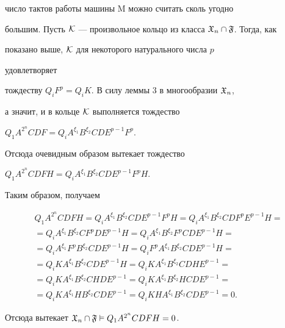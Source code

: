 число тактов работы машины M можно считать сколь угодно  


большим. Пусть $\cal K$ --- произвольное кольцо из класса $\frak 


X_n\cap\frak F$. Тогда, как  


показано выше, $\cal K$ для некоторого натурального числа $p$ 


удовлетворяет  


тождеству $Q_i F^p=Q_i K$. В силу леммы 3 в многообразии $\frak X_n$,  


а значит, и в кольце $\cal K$ выполняется тождество 


$Q_1A^{2^n}C D F=Q_i A^{\xi_1}B^{\xi_2}C D E^{p-1}F^p$. 


Отсюда очевидным образом вытекает тождество 


$Q_1A^{2^n}C D F H=Q_i A^{\xi_1}B^{\xi_2}C D E^{p-1}F^p H$. 


Таким образом, получаем 


\begin{multline*} 


Q_1A^{2^n}C D F H=Q_i A^{\xi_1}B^{\xi_2}C D E^{p-1}F^p H= 


Q_i A^{\xi_1}B^{\xi_2}C D F^p E^{p-1}H= \\ 


=Q_i A^{\xi_1}B^{\xi_2}C F^p D E^{p-1}H= 


Q_i A^{\xi_1}B^{\xi_2}F^p C D E^{p-1}H= \\ 


=Q_i A^{\xi_1}F^p B^{\xi_2}C D E^{p-1}H= 


Q_i F^p A^{\xi_1}B^{\xi_2}C D E^{p-1}H= \\ 


=Q_i K A^{\xi_1}B^{\xi_2}C D E^{p-1}H= 


Q_i K A^{\xi_1}B^{\xi_2}C D H E^{p-1}= \\ 


=Q_i K A^{\xi_1}B^{\xi_2}C H D E^{p-1}= 


Q_i K A^{\xi_1}B^{\xi_2}H C D E^{p-1}= \\ 


=Q_i K A^{\xi_1}H B^{\xi_2}C D E^{p-1}= 


Q_i K H A^{\xi_1}B^{\xi_2}C D E^{p-1}=0. 


\end{multline*} 


Отсюда вытекает $\frak X_n\cap\frak F\vDash Q_1A^{2^n}C D F H=0$. 


 


